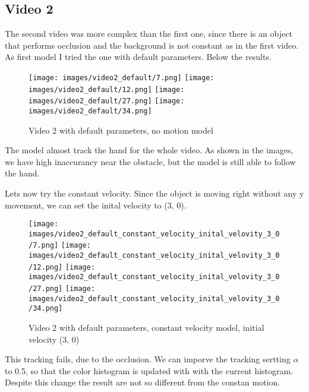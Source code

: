 \documentclass{ETHExercise}
\begin{document}
\subsection{Video 2}
The second video was more complex than the first one, since there is 
an object that performs occlusion and the background is not constant 
as in the first video. As first model I tried the one with 
default parameters. Below the results.

\begin{figure}[!h]
    \texttt{[image: images/video2\_default/7.png]}
  \endminipage
    \texttt{[image: images/video2\_default/12.png]}
  \endminipage
    \texttt{[image: images/video2\_default/27.png]}
  \endminipage\space
    \texttt{[image: images/video2\_default/34.png]}
  \endminipage
  \caption{Video 2 with default parameters, no motion model}
\end{figure}

The model almost track the hand for the whole video. As shown in the images,
we have high inaccurancy near the obstacle, but the model is still able to 
follow the hand.

Lets now try the constant velocity. Since the object is moving right without 
any y movement, we can set the inital velocity to (3, 0).

\begin{figure}[!h]
    \texttt{[image: images/video2\_default\_constant\_velocity\_inital\_velovity\_3\_0/7.png]}
  \endminipage
    \texttt{[image: images/video2\_default\_constant\_velocity\_inital\_velovity\_3\_0/12.png]}
  \endminipage
    \texttt{[image: images/video2\_default\_constant\_velocity\_inital\_velovity\_3\_0/27.png]}
  \endminipage\space
    \texttt{[image: images/video2\_default\_constant\_velocity\_inital\_velovity\_3\_0/34.png]}
  \endminipage
  \caption{Video 2 with default parameters, constant velocity model, initial velocity (3, 0)}
\end{figure}

This tracking fails, due to the occlusion. We can imporve the tracking sertting $\alpha$ to 0.5, 
so that the color histogram is updated with with the current histogram. Despite this change
the result are not so different from the constan motion.
\end{document}
